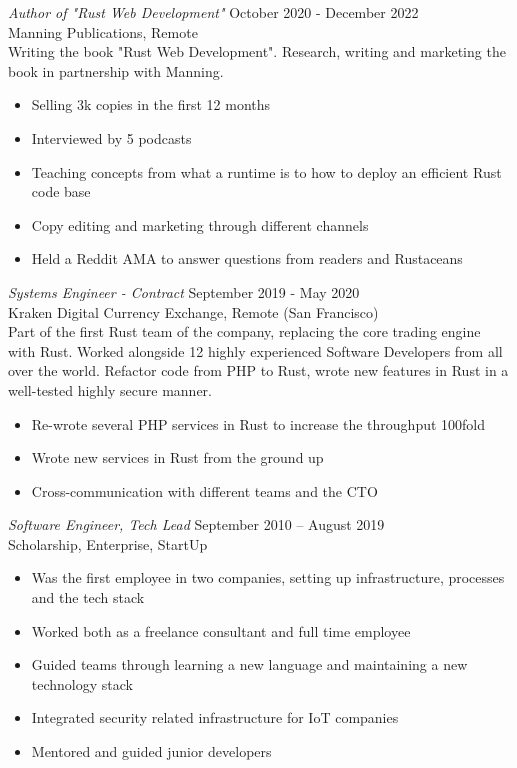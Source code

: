 \documentclass[10pt]{res} %
\begin{document}
\begin{resume}
{\sl Author of "Rust Web Development" } \hfill October 2020 - December 2022 \\
Manning Publications, Remote\\
Writing the book "Rust Web Development". Research, writing and marketing the book in partnership with Manning. 
\begin{itemize} \itemsep -2pt %
\item Selling 3k copies in the first 12 months
\item Interviewed by 5 podcasts
\item Teaching concepts from what a runtime is to how to deploy an efficient Rust code base
\item Copy editing and marketing through different channels
\item Held a Reddit AMA to answer questions from readers and Rustaceans
\end{itemize}
 
{\sl Systems Engineer - Contract} \hfill September 2019 - May 2020 \\
Kraken Digital Currency Exchange, Remote (San Francisco)\\
Part of the first Rust team of the company, replacing the core trading engine with Rust. Worked alongside 12 highly experienced Software Developers from all over the world. Refactor code from PHP to Rust, wrote new features in Rust in a well-tested highly secure manner.
\begin{itemize}
	\item Re-wrote several PHP services in Rust to increase the throughput 100fold 
	\item Wrote new services in Rust from the ground up
	\item Cross-communication with different teams and the CTO
\end{itemize}

{\sl Software Engineer, Tech Lead} \hfill September 2010 -- August 2019 \\
Scholarship, Enterprise, StartUp\\

\begin{itemize}
	\item Was the first employee in two companies, setting up infrastructure, processes and the tech stack
	\item Worked both as a freelance consultant and full time employee
	\item Guided teams through learning a new language and maintaining a new technology stack
	\item Integrated security related infrastructure for IoT companies
	\item Mentored and guided junior developers
\end{itemize}


\end{resume}
\end{document}
